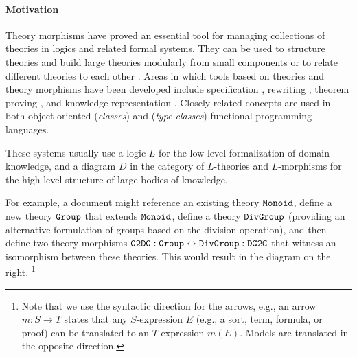 \paragraph{Motivation}
Theory morphisms have proved an essential tool for managing collections of theories in logics and related formal systems.
They can be used to structure theories and build large theories modularly from small components or to relate different theories to each other \cite{asl,devgraphs,littletheories}.
Areas in which tools based on theories and theory morphisms have been developed include specification \cite{obj,hets}, rewriting \cite{maude}, theorem proving \cite{imps,isabelle_locales}, and knowledge representation \cite{RK:mmt:10}.
Closely related concepts are used in both object-oriented (\emph{classes}) and (\emph{type classes}) functional programming languages.


These systems usually use a logic $L$ for the low-level formalization of domain knowledge, and a diagram $D$ in the category of $L$-theories and $L$-morphisms for the high-level structure of large bodies of knowledge.

\begin{wrapfigure}{r}{5.5cm}
\vspace{-3em}
\vspace{-3.5em}
\end{wrapfigure}

For example, a document might reference an existing theory $\operatorname{\mathtt{Monoid}}$, define a new theory $\operatorname{\mathtt{Group}}$ that extends $\operatorname{\mathtt{Monoid}}$, define a theory $\operatorname{\mathtt{DivGroup}}$ (providing an alternative formulation of groups based on the division operation), and then define two theory morphisms $\operatorname{\mathtt{G2DG}}:\operatorname{\mathtt{Group}}\leftrightarrow \operatorname{\mathtt{DivGroup}}:\operatorname{\mathtt{DG2G}}$ that witness an isomorphism between these theories.
This would result in the diagram on the right.%
\footnote{Note that we use the syntactic direction for the arrows, e.g., an arrow $m:S\to T$ states that any $S$-expression $E$ (e.g., a sort, term, formula, or proof) can be translated to an $T$-expression $m(E)$. Models are translated in the opposite direction.}


